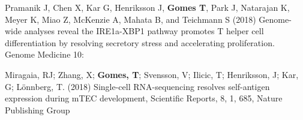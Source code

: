 Pramanik J, Chen X, Kar G, Henriksson J, \textbf{Gomes T}, Park J, Natarajan K, Meyer K, Miao Z, McKenzie A, Mahata B, and Teichmann S (2018) Genome-wide analyses reveal the IRE1a-XBP1 pathway promotes T helper cell differentiation by resolving secretory stress and accelerating proliferation. Genome Medicine 10:\newline

Miragaia, RJ; Zhang, X; \textbf{Gomes, T}; Svensson, V; Ilicic, T; Henriksson, J; Kar, G; Lönnberg, T. (2018) Single-cell RNA-sequencing resolves self-antigen expression during mTEC development, Scientific Reports, 8, 1, 685, Nature Publishing Group\newline


